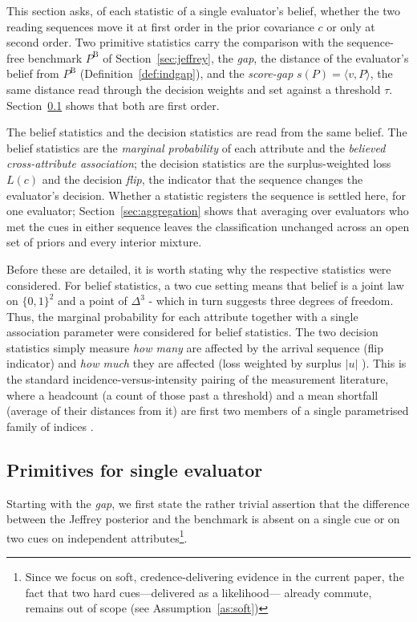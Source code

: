 \documentclass[a4paper,fleqn]{cas-sc}
\theoremstyle{remark}
\theoremstyle{definition}
\newcommand{\PB}{P^{\mathrm{B}}}
\newcommand{\vv}{v}
\begin{document}
This section asks, of each statistic of a single evaluator's belief, whether the
two reading sequences move it at first order in the prior covariance $c$ or only at
second order. Two primitive statistics carry the comparison with the sequence-free
benchmark $\PB$ of Section~\ref{sec:jeffrey}, the \emph{gap}, the distance of the
evaluator's belief from $\PB$ (Definition~\ref{def:indgap}), and the
\emph{score-gap} $s(P)=\langle\vv,P\rangle$, the same distance read through the
decision weights and set against a threshold $\tau$.
Section~\ref{sec:individual_primitives} shows that both are first order.
\par
The belief statistics and the decision statistics are read from the same belief.
The belief statistics are the \emph{marginal probability} of each attribute and the
\emph{believed cross-attribute association}; the decision statistics are the
surplus-weighted loss $L(c)$ and the decision \emph{flip}, the indicator that the
sequence changes the evaluator's decision. Whether a statistic registers the
sequence is settled here, for one evaluator; Section~\ref{sec:aggregation} shows
that averaging over evaluators who met the cues in either sequence leaves the
classification unchanged across an open set of priors and every interior
mixture.

Before these are detailed, it is worth stating why the respective statistics were considered. For belief statistics, a two cue setting means that belief is a joint law on $\{0,1\}^{2}$ and a point of $\Delta^{3}$ - which in turn suggests three degrees of freedom. Thus, the marginal probability for each attribute together with a single association parameter were considered for belief statistics. The two decision statistics simply measure \emph{how many} are affected by the arrival sequence (flip indicator) and \emph{how much} they are affected (loss weighted by surplus $|u|$ ). This is the standard incidence-versus-intensity pairing of the measurement literature, where a headcount (a count of those past a threshold) and a mean shortfall (average of their distances from it) are first two members of a single parametrised family of indices \citep{FosterGreerThorbecke1984}.

\subsection{Primitives for single evaluator}\label{sec:individual_primitives}
Starting with the \emph{gap}, we first state the rather trivial assertion that the difference between the Jeffrey posterior and the benchmark is absent on a single cue or on two cues on independent attributes\footnote{Since we focus on soft, credence-delivering evidence in the current paper, the fact that two hard cues---delivered as a likelihood--- already commute, remains out of scope (see Assumption~\ref{as:soft})}.
\end{document}
